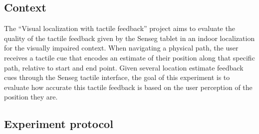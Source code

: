 \subsection{Context}
The ``Visual localization with tactile feedback'' project aims to evaluate the quality of the tactile feedback given by the Senseg tablet in an indoor localization for the visually impaired context. When navigating a physical path, the user receives a tactile cue that encodes an estimate of their position along that specific path, relative to start and end point. Given several location estimate feedback cues through the Senseg tactile interface, the goal of this experiment is to evaluate how accurate this tactile feedback is based on the user perception of the position they are.

\subsection{Experiment protocol}

